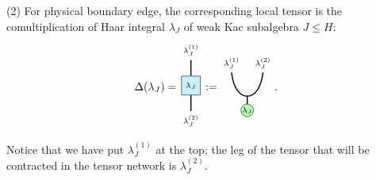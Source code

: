 \documentclass[a4paper,11pt]{article}
\theoremstyle{theorem}
\theoremstyle{remark}
\newcommand{\cone}{(1)}
\newcommand{\ctwo}{(2)}
\begin{document}
(2) For physical boundary edge, the corresponding local tensor is the comultiplication of Haar integral $\lambda_J$ of weak Kac subalgebra $J\leq H$:
\begin{equation}
     \Delta(\lambda_J)= \begin{aligned}			
\begin{tikzpicture}
    \node[draw, fill=cyan!20, minimum width=0.6cm, minimum height=0.6cm] (center) at (0,0) {$\scriptstyle\lambda_J$};
    \draw[line width=1.0pt] (center.north) -- ++(0,.5) node[above] {$\scriptstyle\lambda_J^{\cone}$};
    \draw[line width=1.0pt ] (center.south) -- ++(0,-.5) node[below] {$\scriptstyle \lambda_J^{\ctwo}$};
\end{tikzpicture}
\end{aligned} :=  \begin{aligned}
				\begin{tikzpicture}
					\draw[black, line width=1.0pt]  (-0.5, 1) .. controls (-0.4, 0) and (0.4, 0) .. (0.5, 1);
					\draw[black, line width=1.0pt]  (0,0.23)--(0,-0.23);
        \filldraw[green!30, draw=black] 
       (0,-0.2) circle (0.2);
    \node at (0, -0.2) {\textcolor{black}{$\scriptstyle \lambda_J$}};
                   \node at (-0.5, 1.3) {$\scriptstyle \lambda_J^{\cone}$};
	                   \node at (0.5, 1.3) {$\scriptstyle \lambda_J^{\ctwo}$};			
    \end{tikzpicture}
\end{aligned}.
\end{equation}
Notice that we have put \( \lambda_J^{\cone} \) at the top; the leg of the tensor that will be contracted in the tensor network is \( \lambda_J^{\ctwo} \).
\end{document}
